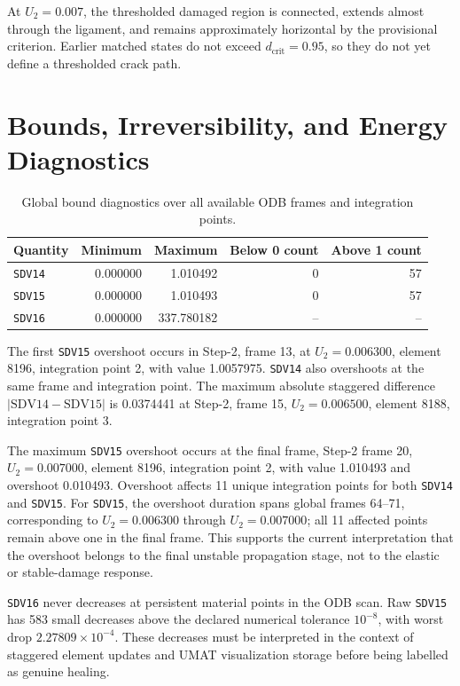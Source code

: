\documentclass[11pt,a4paper]{article}
\begin{document}
At \(U_2=0.007\), the thresholded damaged region is connected, extends almost through the ligament, and remains approximately horizontal by the provisional criterion. Earlier matched states do not exceed \(d_{\mathrm{crit}}=0.95\), so they do not yet define a thresholded crack path.

\section{Bounds, Irreversibility, and Energy Diagnostics}

\begin{table}[H]
\centering
\caption{Global bound diagnostics over all available ODB frames and integration points.}
\begin{tabular}{@{}lrrrr@{}}
\toprule
Quantity & Minimum & Maximum & Below 0 count & Above 1 count \\
\midrule
\texttt{SDV14} & 0.000000 & 1.010492 & 0 & 57 \\
\texttt{SDV15} & 0.000000 & 1.010493 & 0 & 57 \\
\texttt{SDV16} & 0.000000 & 337.780182 & -- & -- \\
\bottomrule
\end{tabular}
\end{table}

The first \texttt{SDV15} overshoot occurs in Step-2, frame 13, at \(U_2=0.006300\), element 8196, integration point 2, with value 1.0057975. \texttt{SDV14} also overshoots at the same frame and integration point. The maximum absolute staggered difference \(|\mathrm{SDV14}-\mathrm{SDV15}|\) is 0.0374441 at Step-2, frame 15, \(U_2=0.006500\), element 8188, integration point 3.

The maximum \texttt{SDV15} overshoot occurs at the final frame, Step-2 frame 20, \(U_2=0.007000\), element 8196, integration point 2, with value 1.010493 and overshoot 0.010493. Overshoot affects 11 unique integration points for both \texttt{SDV14} and \texttt{SDV15}. For \texttt{SDV15}, the overshoot duration spans global frames 64--71, corresponding to \(U_2=0.006300\) through \(U_2=0.007000\); all 11 affected points remain above one in the final frame. This supports the current interpretation that the overshoot belongs to the final unstable propagation stage, not to the elastic or stable-damage response.

\texttt{SDV16} never decreases at persistent material points in the ODB scan. Raw \texttt{SDV15} has 583 small decreases above the declared numerical tolerance \(10^{-8}\), with worst drop \(2.27809\times10^{-4}\). These decreases must be interpreted in the context of staggered element updates and UMAT visualization storage before being labelled as genuine healing.
\end{document}
